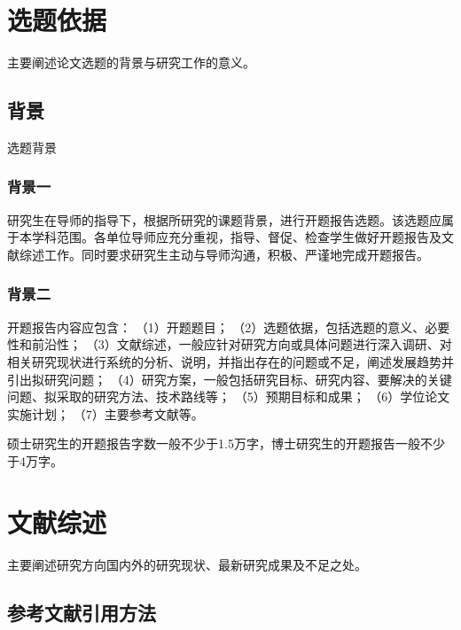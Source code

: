 \documentclass[master,AutoFakeBold=true]{buaathesisproposal}
\begin{document}


\maketitle
\makecontents

\pagestyle{mainmatter}

\section{选题依据}
主要阐述论文选题的背景与研究工作的意义。
\subsection{背景}

选题背景

\subsubsection{背景一}

研究生在导师的指导下，根据所研究的课题背景，进行开题报告选题。该选题应属于本学科范围。各单位导师应充分重视，指导、督促、检查学生做好开题报告及文献综述工作。同时要求研究生主动与导师沟通，积极、严谨地完成开题报告。

\subsubsection{背景二}

开题报告内容应包含：
（1）开题题目；
（2）选题依据，包括选题的意义、必要性和前沿性；
（3）文献综述，一般应针对研究方向或具体问题进行深入调研、对相关研究现状进行系统的分析、说明，并指出存在的问题或不足，阐述发展趋势并引出拟研究问题；
（4）研究方案，一般包括研究目标、研究内容、要解决的关键问题、拟采取的研究方法、技术路线等；
（5）预期目标和成果；
（6）学位论文实施计划；
（7）主要参考文献等。


硕士研究生的开题报告字数一般不少于1.5万字，博士研究生的开题报告一般不少于4万字。


\section{文献综述}

主要阐述研究方向国内外的研究现状、最新研究成果及不足之处。

\subsection{参考文献引用方法}
\end{document}
